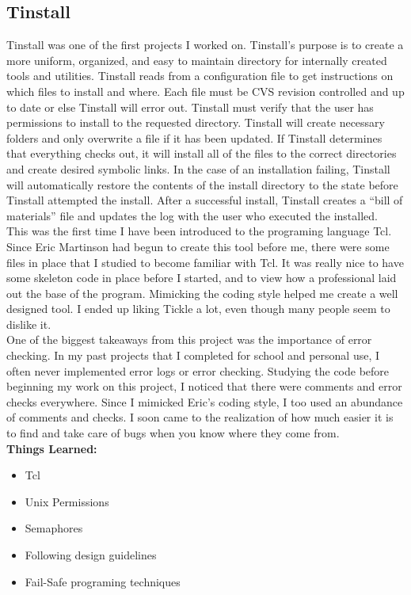 \documentclass[letterpaper,10pt,notitlepage,fleqn]{article}
\begin{document}
\subsection{Tinstall}
\indent Tinstall was one of the first projects I worked on. Tinstall's purpose is to create 
a more uniform, organized, and easy to maintain directory for internally created 
tools and utilities. Tinstall reads from a configuration file to get instructions 
on which files to install and where. Each file must be CVS revision controlled and 
up to date or else Tinstall will error out. Tinstall must verify that the user has 
permissions to install to the requested directory. Tinstall will create necessary folders and only overwrite 
a file if it has been updated. If Tinstall determines that everything checks 
out, it will install all of the files to the correct directories and create desired 
symbolic links. In the case of an installation failing, Tinstall will automatically restore the 
contents of the install directory to the state before Tinstall attempted the install. After a successful 
install, Tinstall creates a ``bill of materials'' file and updates the log with the 
user who executed the installed.
\\
\indent This was the first time I have been introduced to the programing language Tcl. 
Since Eric Martinson had begun to create this tool before me, there were 
some files in place that I studied to become familiar with Tcl. It was really 
nice to have some skeleton code in place before I started, and to view how a professional
laid out the base of the program. Mimicking the coding style helped me create a well designed 
tool. I ended up liking Tickle a lot, even though many people seem to dislike it. 
\\
\indent One of the biggest takeaways from this project was the importance of error checking.
In my past projects that I completed for school and personal use, I often 
never implemented error logs or error checking. Studying the code before beginning 
my work on this project, I noticed that there were comments and error checks everywhere.
Since I mimicked Eric's coding style, I too used an abundance of comments and checks.
I soon came to the realization of how much easier it is to find and 
take care of bugs when you know where they come from. \\


\textbf{Things Learned:}
\begin{itemize} 
        \item Tcl
        \item Unix Permissions
        \item Semaphores
        \item Following design guidelines
        \item Fail-Safe programing techniques
    \end{itemize}
\end{document}
